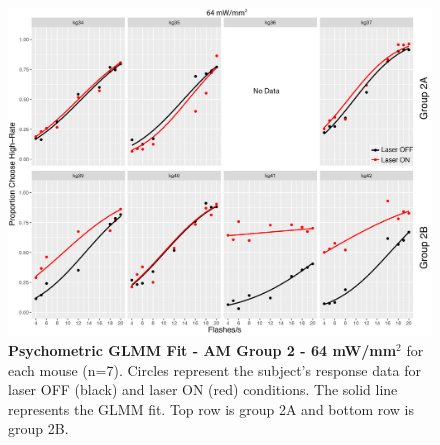 \begin{figure}
  \centering
   \includegraphics[width=\textwidth]{Figures/chapter4/glmm_PMFS_64mWmm2.png}
  \caption[Psychometric GLMM Fit - AM Group 2 - 64 mW/mm$^{2}$]{\textbf{Psychometric GLMM Fit - AM Group 2 - 64 mW/mm$^{2}$} for each mouse (n=7). Circles represent the subject's response data for laser OFF (black) and laser ON (red) conditions. The solid line represents the GLMM fit. Top row is group 2A and bottom row is group 2B. }
   \label{fig:amGLMM64}
\end{figure}






